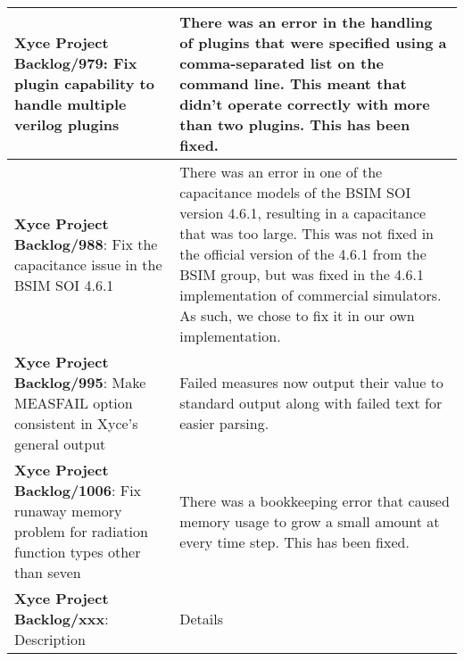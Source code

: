 {\begin{longtable}[h] {>{\raggedright\small}m{2in}|>{\raggedright\let\\\tabularnewline\small}m{3.5in}}
  \textbf{Xyce Project Backlog/979}: Fix plugin capability to handle multiple verilog plugins & There was an error in the handling of plugins that were specified using a comma-separated list on the command line.  This meant that \Xyce{} didn't operate correctly with more than two plugins.  This has been fixed.
  \\\hline
  
  \textbf{Xyce Project Backlog/988}: Fix the capacitance issue in the BSIM SOI 4.6.1 &  There was an error in one of the capacitance models of the BSIM SOI version 4.6.1, resulting in a capacitance that was too large.  This was not fixed in the official version of the 4.6.1 from the BSIM group, but was fixed in the 4.6.1 implementation of commercial simulators.  As such, we chose to fix it in our own implementation. 
  \\\hline

  \textbf{Xyce Project Backlog/995}: Make MEASFAIL option consistent in Xyce's general output &  Failed measures now output their value to standard output along with failed text for easier parsing.
  \\\hline

  \textbf{Xyce Project Backlog/1006}: 
  Fix runaway memory problem for radiation function types other than seven &  There was a bookkeeping error that caused memory usage to grow a small amount at every time step.  This has been fixed.
  \\\hline

\textbf{Xyce Project Backlog/xxx}: Description
  &  Details
  \\\hline


\end{longtable}
}
